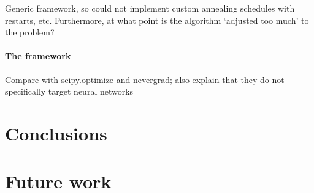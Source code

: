 Generic framework, so could not implement custom annealing schedules with restarts, etc.
Furthermore, at what point is the algorithm `adjusted too much' to the problem?

\paragraph{The framework}
Compare with scipy.optimize and nevergrad; also explain that they do not specifically target neural networks

\section{Conclusions}

\section{Future work}